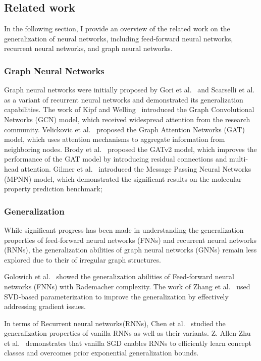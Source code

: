 
\subsection{Related work}
In the following section, I provide an overview of the related work on the generalization of neural networks, including feed-forward neural networks, recurrent neural networks, and graph neural networks.

\subsubsection{Graph Neural Networks}
Graph neural networks were initially proposed by Gori et al.~\cite{gori2005new} and Scarselli et al.~\cite{scarselli2008graph} as a variant of recurrent neural networks and demonstrated its generalization capabilities. The work of Kipf and Welling~\cite{kipf2016semi} introduced the Graph Convolutional Networks (GCN) model, which received widespread attention from the research community. Velickovic et al.~\cite{velickovic2020pointer} proposed the Graph Attention Networks (GAT) model, which uses attention mechanisms to aggregate information from neighboring nodes. Brody et al.~\cite{brody2021attentive} proposed the GATv2 model, which improves the performance of the GAT model by introducing residual connections and multi-head attention. Gilmer et al.~\cite{gilmer2017neural} introduced the Message Passing Neural Networks (MPNN) model, which demonstrated the significant results on the molecular property prediction benchmark;

\subsubsection{Generalization}
While significant progress has been made in understanding the generalization properties of feed-forward neural networks (FNNs) and recurrent neural networks (RNNs), the generalization abilities of graph neural networks (GNNs) remain less explored due to their of irregular graph structures.

Golowich et al.~\cite{golowich2018size} showed the generalization abilities of Feed-forward neural networks (FNNs) with Rademacher complexity. The work of Zhang et al.~\cite{zhang2018stabilizing} used SVD-based parameterization to improve the generalization by effectively addressing gradient issues.

In terms of Recurrent neural networks(RNNs), Chen et al.~\cite{chen2019generalization} studied the generalization properties of vanilla RNNs as well as their variants. Z. Allen-Zhu et al.~\cite{allen2019can} demonstrates that vanilla SGD enables RNNs to efficiently learn concept classes and overcomes prior exponential generalization bounds. 

